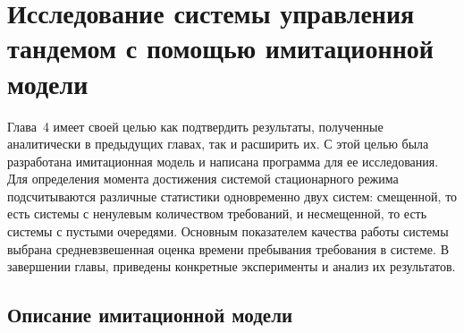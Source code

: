 \documentclass{report}
\begin{document}
\newpage
\section{Исследование системы управления тандемом с помощью имитационной модели}
Глава~4 имеет своей целью как подтвердить результаты, полученные аналитически в предыдущих главах, так и расширить их. С этой целью была разработана имитационная модель и написана программа для ее исследования. Для определения момента достижения системой стационарного режима подсчитываются различные статистики одновременно двух систем: смещенной, то есть системы с ненулевым количеством требований, и несмещенной, то есть системы с пустыми очередями. Основным показателем качества работы системы выбрана средневзвешенная оценка времени пребывания требования в системе. В завершении главы, приведены конкретные эксперименты и анализ их результатов.

\subsection{Описание имитационной модели}
\end{document}
